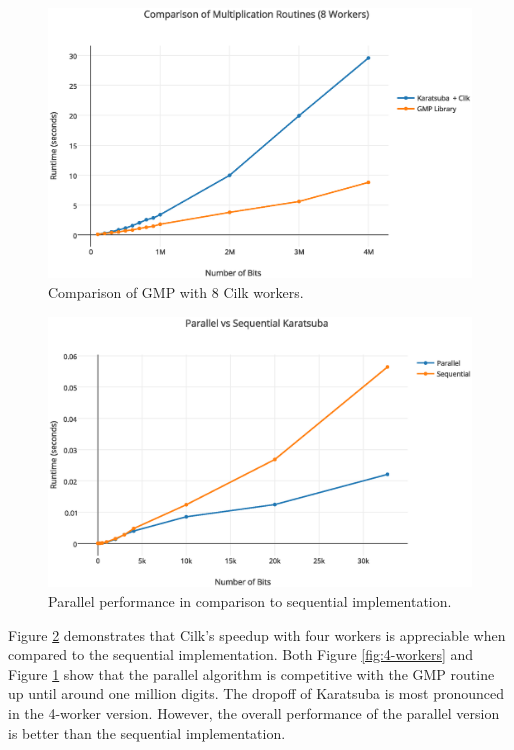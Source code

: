 \documentclass[8pt, twocolumn]{article}
\begin{document}
\begin{figure}[t]
    \includegraphics[scale=0.4]{8-workers}
    \caption{Comparison of GMP with 8 Cilk workers.}
    \label{fig:8-workers}
\end{figure}

\begin{figure}[t]
    \includegraphics[scale=0.4]{parallel-vs-sequential}
    \caption{Parallel performance in comparison to sequential implementation.}
    \label{fig:parallel-vs-sequential}
\end{figure}


Figure \ref{fig:parallel-vs-sequential} demonstrates that Cilk's speedup with
four workers is appreciable when compared to the sequential implementation.
Both Figure \ref{fig:4-workers} and Figure \ref{fig:8-workers} show that the
parallel algorithm is competitive with the GMP routine up until around one
million digits.  The dropoff of Karatsuba is most pronounced in the 4-worker
version.  However, the overall performance of the parallel version is better
than the sequential implementation.
\end{document}
